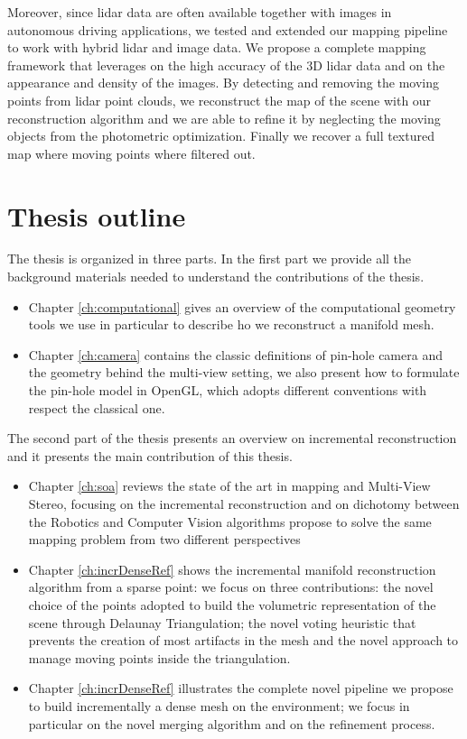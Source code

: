 Moreover, since lidar data are often available together with images in autonomous driving applications, we tested and extended our mapping pipeline to work with hybrid lidar and image data.
We propose a complete mapping framework  that leverages on the high accuracy of the 3D lidar data and on the appearance and density of the images.
By detecting and removing the moving points from lidar point clouds, we reconstruct the map of the scene with our reconstruction algorithm and we are able to refine it by neglecting the moving objects from the photometric optimization. Finally we recover a full textured map where moving points where filtered out.



\section{Thesis outline}

The thesis is organized in three parts. 
In the first part we provide all the background materials needed to understand the contributions of the thesis.
\begin{itemize}
 \item Chapter \ref{ch:computational} gives an overview of the computational geometry tools we use in particular to describe ho we reconstruct a manifold mesh.
 \item Chapter \ref{ch:camera} contains the classic definitions of pin-hole camera and the geometry behind the  multi-view setting, we also present how to formulate the pin-hole model in OpenGL, which adopts different conventions with respect the classical one.
\end{itemize}

The second part of the thesis presents an overview on incremental reconstruction and it presents the main contribution of this thesis.
\begin{itemize}
 \item Chapter \ref{ch:soa} reviews the state of the art in mapping and Multi-View Stereo, focusing on the incremental reconstruction and on dichotomy between the Robotics and  Computer Vision algorithms propose to solve the same mapping problem from two different perspectives
 \item Chapter \ref{ch:incrDenseRef} shows the incremental manifold reconstruction algorithm from a sparse point:  we focus on three contributions: the novel choice of the points adopted to build the volumetric representation of the scene through Delaunay Triangulation; the novel voting heuristic that prevents the creation of most artifacts in the mesh and the novel approach to manage moving points inside the triangulation.
 \item Chapter \ref{ch:incrDenseRef} illustrates the complete novel pipeline we propose to build incrementally a dense mesh on the environment; we focus in particular on the novel merging algorithm and on the refinement process.
\end{itemize}

